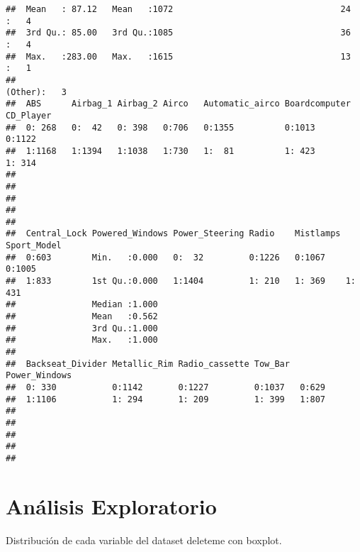 \documentclass[
]{article}
\begin{document}
\begin{verbatim}
##  Mean   : 87.12   Mean   :1072                                 24     :   4    
##  3rd Qu.: 85.00   3rd Qu.:1085                                 36     :   4    
##  Max.   :283.00   Max.   :1615                                 13     :   1    
##                                                                (Other):   3    
##  ABS      Airbag_1 Airbag_2 Airco   Automatic_airco Boardcomputer CD_Player
##  0: 268   0:  42   0: 398   0:706   0:1355          0:1013        0:1122   
##  1:1168   1:1394   1:1038   1:730   1:  81          1: 423        1: 314   
##                                                                            
##                                                                            
##                                                                            
##                                                                            
##                                                                            
##  Central_Lock Powered_Windows Power_Steering Radio    Mistlamps Sport_Model
##  0:603        Min.   :0.000   0:  32         0:1226   0:1067    0:1005     
##  1:833        1st Qu.:0.000   1:1404         1: 210   1: 369    1: 431     
##               Median :1.000                                                
##               Mean   :0.562                                                
##               3rd Qu.:1.000                                                
##               Max.   :1.000                                                
##                                                                            
##  Backseat_Divider Metallic_Rim Radio_cassette Tow_Bar  Power_Windows
##  0: 330           0:1142       0:1227         0:1037   0:629        
##  1:1106           1: 294       1: 209         1: 399   1:807        
##                                                                     
##                                                                     
##                                                                     
##                                                                     
## 
\end{verbatim}

\hypertarget{anuxe1lisis-exploratorio}{%
\section{Análisis Exploratorio}\label{anuxe1lisis-exploratorio}}

Distribución de cada variable del dataset deleteme con boxplot.
\end{document}
